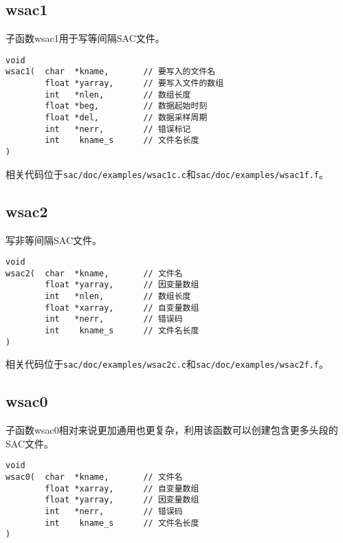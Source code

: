 \subsection{wsac1}
子函数wsac1用于写等间隔SAC文件。
\begin{lstlisting}[style=C]
void                                        
wsac1(  char  *kname,       // 要写入的文件名                                                       
        float *yarray,      // 要写入文件的数组                        
        int   *nlen,        // 数组长度                                     
        float *beg,         // 数据起始时刻                                           
        float *del,         // 数据采样周期                                        
        int   *nerr,        // 错误标记                                        
        int    kname_s      // 文件名长度
)
\end{lstlisting}

相关代码位于\lstinline{sac/doc/examples/wsac1c.c}和\lstinline{sac/doc/examples/wsac1f.f}。

\subsection{wsac2}
写非等间隔SAC文件。

\begin{lstlisting}[style=C]
void                    
wsac2(  char  *kname,       // 文件名
        float *yarray,      // 因变量数组                                                   
        int   *nlen,        // 数组长度                                             
        float *xarray,      // 自变量数组                                               
        int   *nerr,        // 错误码                                             
        int    kname_s      // 文件名长度
)
\end{lstlisting}

相关代码位于\lstinline{sac/doc/examples/wsac2c.c}和\lstinline{sac/doc/examples/wsac2f.f}。

\subsection{wsac0}
子函数wsac0相对来说更加通用也更复杂，利用该函数可以创建包含更多头段的SAC文件。

\begin{lstlisting}[style=C]
void                                                                                
wsac0(  char  *kname,       // 文件名
        float *xarray,      // 自变量数组                                                 
        float *yarray,      // 因变量数组                                             
        int   *nerr,        // 错误码                                             
        int    kname_s      // 文件名长度
)
\end{lstlisting}

